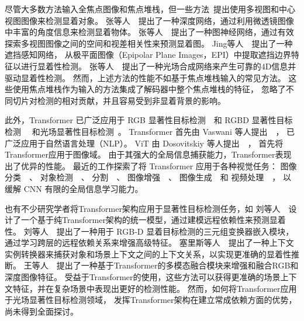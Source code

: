 尽管大多数方法输入全焦点图像和焦点堆栈，但一些方法\cite{jing2021occlusion, wang2022lfbcnet, zhang2022exploring}~提出使用多视图和中心视图图像来检测显着对象。 
张等人~\cite{zhang2020light}~提出了一种深度网络，通过利用微透镜图像中丰富的角度信息来检测显着物体。 
张等人~\cite{zhang2021geometry}~提出了一种图神经网络，通过有效探索多视图图像之间的空间和视差相关性来预测显着图。 
Jing等人~\cite{jing2021occlusion}~提出了一种遮挡感知网络，
从极平面图像（Epipolar Plane Images，EPI）中提取遮挡边界特征以进行显着性检测。 
张等人~\cite{zhang2022exploring}~提出了一种光场合成网络来产生可靠的4D信息并驱动显着性检测。 
然而，上述方法的性能不如基于焦点堆栈输入的常见方法。 
这些使用焦点堆栈作为输入的方法集成了解码器中整个焦点堆栈的特征，
忽略了不同切片对检测的相对贡献，并且容易受到非显着背景的影响。 


%
%




此外，Transformer 已广泛应用于 
RGB 显著性目标检测~\cite{liu2021visual, siris2021scene}~和 
RGBD 显著性目标检测~\cite{liu2021tritransnet, wang2021mutualformer}~
和光场显著性目标检测~\cite{liu2023lftransnet}。
Transformer 首先由 Vaswani 等人提出~\cite{vaswani2017attention}~，
已广泛应用于自然语言处理（NLP）。
ViT 由 Dosovitskiy 等人提出~\cite{dosovitskiy2020image}~，
首先将Transformer应用于图像域。
由于其强大的全局信息捕获能力，Transformer表现出了优异的性能。
最近的工作探索了将 Transformer 应用于各种视觉任务：
图像分类~\cite{chen2020generative, dosovitskiy2020image}~、
对象检测~\cite{zhu2020deformable, dai2021up, sun2021rethinking}~、
分割~\cite{chen2021pre, wang2021end}~、
图像增强~\cite{yang2020learning, chen2021pre}~、
图像生成~\cite{parmar2018image}~和 
视频处理~\cite{zhou2018end, zheng2020end}~，
以缓解 CNN 有限的全局信息学习能力。



也有不少研究学者将Transformer架构应用于显著性目标检测任务，如
刘等人~\cite{liu2021visual}~设计了一个基于纯Transformer架构的统一模型，通过建模远程依赖性来预测显着性。
刘等人~\cite{liu2021tritransnet}~提出了一种用于 RGB-D 显着目标检测的三元组变换器嵌入模块，通过学习跨层的远程依赖关系来增强高级特征。 
塞里斯等人~\cite{siris2021scene}~提出了一种上下文实例转换器来捕获对象和场景上下文之间的上下文关系，以实现更准确的显着性推断。 
王等人~\cite{wang2021mutualformer}~提出了一种基于Transformer的多模态融合模块来增强和融合RGB和深度图像特征。
受益于Transformer的使用，这些方法可以获得更准确的场景上下文特征，并在复杂场景中表现出更好的检测性能。 然而，如何将Transformer应用于光场显著性目标检测领域，
发挥Transformer架构在建立常成依赖方面的优势，
尚未得到全面探讨。 




